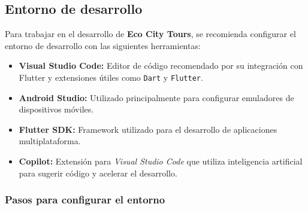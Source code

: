 \subsection{Entorno de desarrollo}

Para trabajar en el desarrollo de \textbf{Eco City Tours}, se recomienda configurar el entorno de desarrollo con las siguientes herramientas:

\begin{itemize}
	\item \textbf{Visual Studio Code:} Editor de código recomendado por su integración con Flutter y extensiones útiles como \texttt{Dart} y \texttt{Flutter}.
	\item \textbf{Android Studio:} Utilizado principalmente para configurar emuladores de dispositivos móviles.
	\item \textbf{Flutter SDK:} Framework utilizado para el desarrollo de aplicaciones multiplataforma. 
	\item \textbf{Copilot:} Extensión para \textit{Visual Studio Code} que utiliza inteligencia artificial para sugerir código y acelerar el desarrollo.
\end{itemize}

\subsubsection{Pasos para configurar el entorno}


